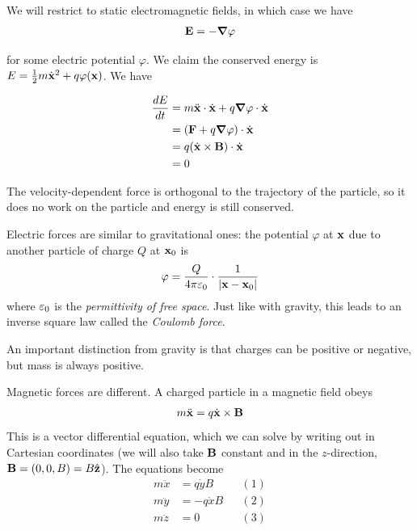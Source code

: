 \documentclass{../../template/note}
\begin{document}
    We will restrict to static electromagnetic fields, in which case we have
    \begin{align*}
        \V E = -\grad \varphi
    \end{align*}
    
    for some electric potential \(\varphi\). We claim the conserved energy is \(E = \frac{1}{2}m \dot{\V x}^2 + q\varphi(\V x)\). We have

    \begin{align*}
        \frac{dE}{dt} &= m \ddot{\V x} \cdot \dot{\V x} + q \grad \varphi \cdot \dot{\V x} \\
        &= (\V F + q \grad \varphi) \cdot \dot{\V x} \\
        &= q(\dot{\V x} \times \V B) \cdot \dot{\V x} \\
        &= 0
    \end{align*}
    
    The velocity-dependent force is orthogonal to the trajectory of the particle, so it does no work on the particle and energy is still conserved.

    Electric forces are similar to gravitational ones: the potential \(\varphi\) at \(\V x\) due to another particle of charge \(Q\) at \(\V x_0\) is
    \begin{align*}
        \varphi = \frac{Q}{4 \pi \eps_0} \cdot \frac{1}{|\V x - \V x_0|}
    \end{align*}
    where \(\varepsilon_0\) is the \emph{permittivity of free space}. Just like with gravity, this leads to an inverse square law called the \emph{Coulomb force}.

    An important distinction from gravity is that charges can be positive or negative, but mass is always positive. 

    Magnetic forces are different. A charged particle in a magnetic field obeys
    \begin{align*}
        m \ddot{\V x} = q \dot{\V x} \times \vec B
    \end{align*}
    This is a vector differential equation, which we can solve by writing out in Cartesian coordinates (we will also take \(\V B\) constant and in the \(z\)-direction, \(\V B = (0, 0, B) = B \hvec z\)). The equations become
    \begin{align*}
        m \ddot x &= q \dot y B && (1)\\
        m \ddot y &= -q \dot x B && (2)\\
        m \ddot z &= 0 && (3)
    \end{align*}
    
\end{document}
